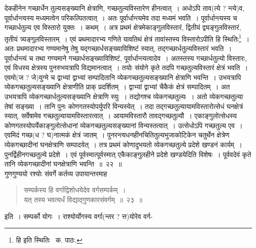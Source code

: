 \documentclass[11pt, openany]{book}
\begin{document}
\noindent देकहीनेन गच्छार्धेन तुल्यसङ्ख्यानि क्षेत्राणि, गच्छतुल्यविस्तारेण हीनत्वात्~। अधोऽपि ताव(त्ये ? न्त्ये)व, पूर्वार्धान्त्यस्य मध्यमत्वेन परिकल्पितत्वात्~। अतः पूर्वार्धान्त्यमेव तदा मध्यमं भवति~। पूर्वार्धान्त्यस्य च गच्छार्धतुल्य एव विस्तारो युक्तः~। कथम्~। अत्र प्रथमं
क्षेत्रमेकाङ्गुलविस्तारं, द्वितीयं द्व्यङ्गुलविस्तारं, तृतीयं त्र्यङ्गुलविस्तारम्~। एवं प्रथमादारभ्य गणिते यावतिथं क्षेत्रं तावांस्तस्य विस्तारोऽपीति हि स्थितिः\renewcommand{\thefootnote}{१}\footnote{हि इति स्थितिः \textendash\ क. पाठः.}~। अतः प्रथमादारभ्य गण्यमानेषु तेषु यद्गच्छार्धसङ्ख्याविशिष्टं स्यात्, तद्गच्छार्धतुल्यविस्तारं भवति~। पूर्वार्धान्त्यं च तथा गण्यमाने
गच्छार्धसङ्ख्याविशिष्टं, पूर्वार्धान्त्यत्वादेव~। अतस्तस्य गच्छार्धतुल्यो विस्तारः, एवं विधस्य क्षेत्रस्य पुनरुभयत्रापि विद्यमानत्वात्~। तयोः संयोगे कृते तदपि गच्छतुल्यविस्तारं क्षेत्रं भवति~। एवमो(ज ? जे)युग्मे च द्वाभ्यां द्वाभ्यां सम्पादितानि व्येकगच्छतुल्यसङ्ख्यानि क्षेत्राणि भवन्ति~। उभयत्रापि व्येकगच्छतुल्यसङ्ख्यानि क्षेत्राणीति प्राक् प्रदर्शितम्~। द्वाभ्यां द्वाभ्यां चैकैकं क्षेत्रं सम्पादितम्~। अत उभयत्रापि व्येकगच्छार्धतुल्यसङ्ख्यानि क्षेत्राणि स्युः~। तद्योगश्च व्येकगच्छतुल्यः~। अतो व्येकगच्छतुल्या तेषां सङ्ख्या~। तानि पुनः कोणगतस्योपर्युपरि विन्यस्येत्~। तदा तद्गच्छतुल्यायामविस्तारोत्सेधं घनक्षेत्रं स्यात्, सर्वेषामेव गच्छतुल्यायामविस्तारत्वात्~। आयामविस्तारौ तावद्गच्छतुल्यौ~। एकाङ्गुलोत्सेधस्य कोणगतस्योपर्येकाङ्गुलोत्सेधानां व्येकगच्छतुल्यसङ्ख्यानां विन्यस्तत्वात्~। उत्सेधोऽपि गच्छतुल्य एव~। एवमिदं गच्छ(ध ? घ)नात्मकं क्षेत्रं जातम्~। पुनरन्त्यधनहीनचितितुल्यभुजाकोटिकेन चतुर्थेन क्षेत्रेण व्येकगच्छादीनां घनक्षेत्राणि सम्पादयेत्~। तत्र प्रथमं कोणादुभयतो व्येकगच्छतुल्ये प्रदेशे खण्डनं कार्यम्~। पुनर्द्विहीनगच्छतुल्ये प्रदेशे~। एवं पूर्वस्मात्पूर्वस्मात् एकैकाङ्गुलहीने प्रदेशे खण्डयेदिति विशेषः~। पूर्ववदेवं कृते तानि व्येकगच्छादीनां घनक्षेत्राणि भवन्ति~॥~२२~॥\\

गुणगुण्ययो रश्योः संवर्गे कर्तव्य उपायान्तरमाह\textendash 
\begin{quote}
{\ab सम्पर्कस्य हि वर्गाद्विशोधयेदेव वर्गसम्पर्कम्~।\\
यत् तस्य भवत्यर्धं विद्याद्गुणकारसंवर्गम्~॥~२३~॥}
\end{quote}

इति~। सम्पर्को योगः~। राश्योर्योगस्य वर्गा(न्तर ? त्त)योरेव वर्ग- 

\newpage
\end{document}
